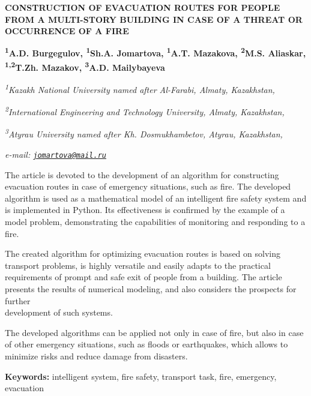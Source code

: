 \begin{articleheader}
{\bfseries CONSTRUCTION OF EVACUATION ROUTES FOR PEOPLE FROM A MULTI-STORY BUILDING IN CASE OF A THREAT OR OCCURRENCE OF A FIRE}

{\bfseries
\textsuperscript{1}A.D. Burgegulov,
\textsuperscript{1}Sh.A. Jomartova\textsuperscript{\envelope },
\textsuperscript{1}A.T. Mazakova,
\textsuperscript{2}M.S. Aliaskar,
\textsuperscript{1,2}T.Zh. Mazakov,
\textsuperscript{3}A.D. Mailybayeva}
\end{articleheader}

\begin{affiliation}
\emph{\textsuperscript{1}Kazakh National University named after Al-Farabi, Almaty, Kazakhstan,}

\emph{\textsuperscript{2}International Engineering and Technology University, Almaty, Kazakhstan,}

\emph{\textsuperscript{3}Atyrau University named after Kh. Dosmukhambetov, Atyrau, Kazakhstan,}

\emph{e-mail: \href{mailto:jomartova@mail.ru}{\nolinkurl{jomartova@mail.ru}}}
\end{affiliation}

The article is devoted to the development of an algorithm for
constructing evacuation routes in case of emergency situations, such as
fire. The developed algorithm is used as a mathematical model of an
intelligent fire safety system and is implemented in Python. Its
effectiveness is confirmed by the example of a model problem,
demonstrating the capabilities of monitoring and responding to a fire.

The created algorithm for optimizing evacuation routes is based on
solving transport problems, is highly versatile and easily adapts to the
practical requirements of prompt and safe exit of people from a
building. The article presents the results of numerical modeling, and
also considers the prospects for further \\development of such systems.

The developed algorithms can be applied not only in case of fire, but
also in case of other emergency situations, such as floods or
earthquakes, which allows to minimize risks and reduce damage from
disasters.

{\bfseries Keywords:} intelligent system, fire safety, transport task, fire,
emergency, evacuation

